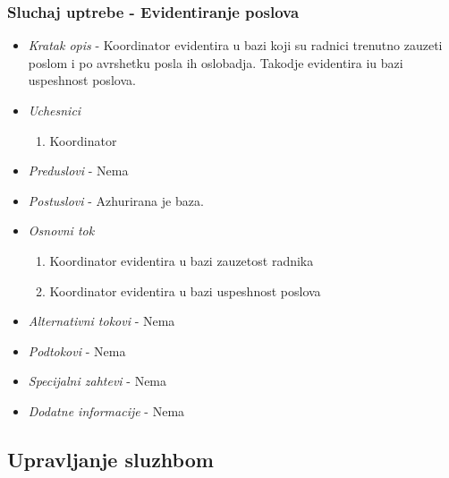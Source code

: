 \documentclass[10 pt]{article}
\begin{document}
	\subsubsection{Sluchaj uptrebe - Evidentiranje poslova}
	\begin{itemize}
		
		\item \textit{Kratak opis} - Koordinator evidentira u bazi koji su radnici trenutno zauzeti poslom i po avrshetku posla ih oslobadja. Takodje evidentira iu bazi uspeshnost poslova.
		\item \textit{Uchesnici}
		\begin{enumerate}
			\item Koordinator
		\end{enumerate}
		
		\item \textit{Preduslovi} - Nema
		
		\item \textit{Postuslovi} - Azhurirana je baza.
		
		\item \textit{Osnovni tok}
		\begin{enumerate}
			\item Koordinator evidentira u bazi zauzetost radnika
			\item Koordinator evidentira u bazi uspeshnost poslova
		\end{enumerate}
		
		\item \textit{Alternativni tokovi} - Nema
		
		\item \textit{Podtokovi} - Nema
		
		\item \textit{Specijalni zahtevi} - Nema
		
		\item \textit{Dodatne informacije} - Nema
		
	\end{itemize}
	

	\subsection{Upravljanje sluzhbom}
	
\end{document}
